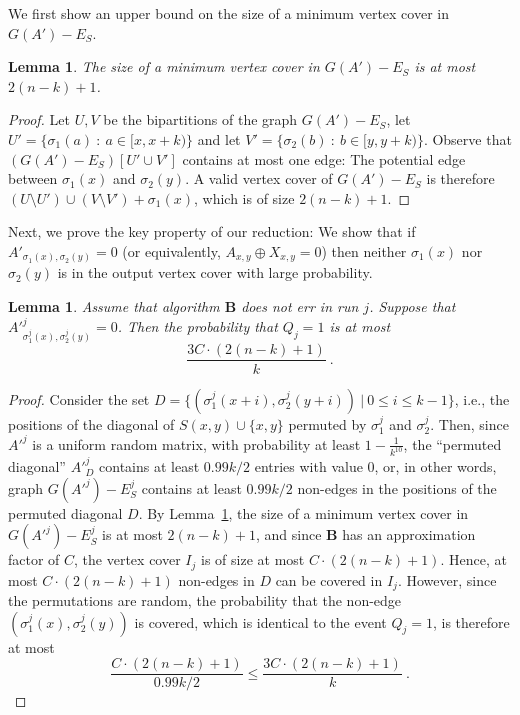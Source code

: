 \documentclass[10pt,a4paper]{article}
\newtheorem{lemma}[theorem]{Lemma}
\begin{document}
We first show an upper bound on the size of a minimum vertex cover in $G(A') - E_S$.

\begin{lemma}\label{lem:vc-size}
 The size of a minimum vertex cover in $G(A') - E_S$ is at most $2(n-k) + 1$.
\end{lemma}
\begin{proof}
Let $U, V$ be the bipartitions of the graph $G(A') - E_S$, let $U' = \{\sigma_1(a) \ : \ a \in [x, x+k) \}$ and let
$V' = \{\sigma_2(b) \ : \ b \in [y, y+k) \}$. Observe that $(G(A') - E_S)[U' \cup V']$ 
contains at most one edge: The potential edge between $\sigma_1(x)$ and $\sigma_2(y)$. A valid vertex cover 
of $G(A') - E_S$ is therefore $(U \setminus U') \cup (V \setminus V') + \sigma_1(x)$,
which is of size $2(n-k) + 1$.
\end{proof}

Next, we prove the key property of our reduction: We show that if $A'_{\sigma_1(x), \sigma_2(y)} = 0$ (or equivalently, 
$A_{x,y} \oplus X_{x,y} = 0$)
then neither $\sigma_1(x)$ nor $\sigma_2(y)$ is in the output vertex cover with large probability.

\begin{lemma} \label{lem:covered}
 Assume that algorithm $\mathbf{B}$ does not err in run $j$. Suppose that 
 $A'^j_{\sigma^j_1(x), \sigma^j_2(y)} = 0$. Then the probability that $Q_j = 1$ is at most 
 $$\frac{3 C \cdot (2(n-k) + 1)}{k} \ .$$
\end{lemma}
\begin{proof}
 Consider the set $D  = \{ (\sigma^j_1(x + i), \sigma^j_2(y+i)) \ | \ 0 \le i \le k-1 \}$, i.e., the positions of the diagonal
 of $S(x,y) \cup \{x, y\}$ permuted by $\sigma^j_1$ and $\sigma^j_2$. Then, since $A'^j$ is a uniform random matrix, with probability
 at least $1-\frac{1}{k^{10}}$, the ``permuted diagonal'' $A'^j_{D}$ contains at least $0.99 k/ 2$ entries with value $0$,
 or, in other words, graph $G(A'^j) - E^j_S$ contains at least $0.99 k/ 2$ non-edges in the positions of the permuted diagonal $D$.
 By Lemma~\ref{lem:vc-size}, the size of a minimum vertex cover in $G(A'^{j}) - E^{j}_S$ is at most $2(n-k) + 1$, and since
 $\mathbf{B}$ has an approximation factor of $C$, the  vertex cover $I_j$ is of size at most $C \cdot (2(n-k) + 1)$. Hence, 
 at most $C \cdot (2(n-k) + 1)$ non-edges in $D$ can be covered in $I_j$. However, since the permutations are random, the 
 probability that the non-edge $(\sigma^j_1(x), \sigma^j_2(y))$
 is covered, which is identical to the event $Q_j = 1$, is therefore at most 
 $$\frac{C \cdot (2(n-k) + 1)}{0.99 k/ 2} \le \frac{3 C \cdot (2(n-k) + 1)}{k} \ .$$
\end{proof}
\end{document}
